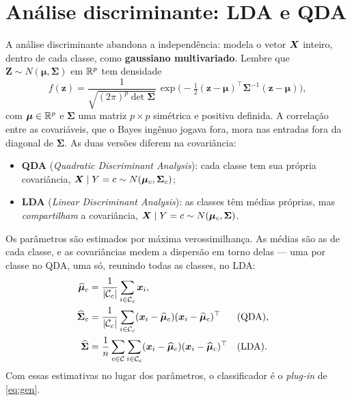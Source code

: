 \documentclass[11pt,a4paper]{article}
\begin{document}
\section{Análise discriminante: LDA e QDA}
A análise discriminante abandona a independência: modela o vetor $\bm{X}$ inteiro,
dentro de cada classe, como \textbf{gaussiano multivariado}. Lembre que
$\bm{Z}\sim N(\bm{\mu},\bm{\Sigma})$ em $\mathbb{R}^p$ tem densidade
\begin{equation}\label{eq:normal}
  f(\bm{z}) = \frac{1}{\sqrt{(2\pi)^p\det\bm{\Sigma}}}\,
  \exp\Big(-\tfrac12(\bm{z}-\bm{\mu})^\top\bm{\Sigma}^{-1}(\bm{z}-\bm{\mu})\Big),
\end{equation}
com $\bm{\mu}\in\mathbb{R}^p$ e $\bm{\Sigma}$ uma matriz $p\times p$ simétrica e positiva
definida. A correlação entre as covariáveis, que o Bayes ingênuo jogava fora, mora
nas entradas fora da diagonal de $\bm{\Sigma}$. As duas versões diferem na
covariância:
\begin{itemize}[leftmargin=1.4cm,nosep]
  \item \textbf{QDA} (\emph{Quadratic Discriminant Analysis}): cada classe tem sua
        própria covariância, $\bm{X}\mid Y=c\sim N(\bm{\mu}_c,\bm{\Sigma}_c)$;
  \item \textbf{LDA} (\emph{Linear Discriminant Analysis}): as classes têm médias
        próprias, mas \emph{compartilham} a covariância,
        $\bm{X}\mid Y=c\sim N(\bm{\mu}_c,\bm{\Sigma})$.
\end{itemize}
Os parâmetros são estimados por máxima verossimilhança. As médias são as de cada
classe, e as covariâncias medem a dispersão em torno delas --- uma por classe no
QDA, uma só, reunindo todas as classes, no LDA:
\begin{align*}
  \widehat{\bm\mu}_c &= \frac{1}{\left\lvert \mathcal{C}_c \right\rvert}\sum_{i\in\mathcal{C}_c}\bm{x}_i, \\
  \widehat{\bm\Sigma}_c &= \frac{1}{\left\lvert \mathcal{C}_c \right\rvert}\sum_{i\in\mathcal{C}_c}
     (\bm{x}_i-\widehat{\bm\mu}_c)(\bm{x}_i-\widehat{\bm\mu}_c)^\top
     && \text{(QDA)}, \\
  \widehat{\bm\Sigma} &= \frac{1}{n}\sum_{c\in\mathcal{C}}\sum_{i\in\mathcal{C}_c}
     (\bm{x}_i-\widehat{\bm\mu}_c)(\bm{x}_i-\widehat{\bm\mu}_c)^\top
     && \text{(LDA)}.
\end{align*}
Com essas estimativas no lugar dos parâmetros, o classificador é o \emph{plug-in}
de \eqref{eq:gen}.
\end{document}
